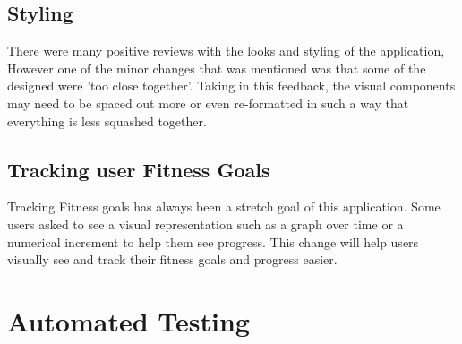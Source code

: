 \documentclass[12pt, titlepage]{article}
\begin{document}
\subsection{Styling}
There were many positive reviews with the looks and styling of the application, However one of the minor changes that was mentioned was that some of the designed were 'too close together'. Taking in this feedback, the visual components may need to be spaced out more or even re-formatted in such a way that everything is less squashed together.
\subsection{Tracking user Fitness Goals}
Tracking Fitness goals has always been a stretch goal of this application. Some users asked to see a visual representation such as a graph over time or a numerical increment to help them see progress. This change will help users visually see and track their fitness goals and progress easier.

\section{Automated Testing}
		
\end{document}
